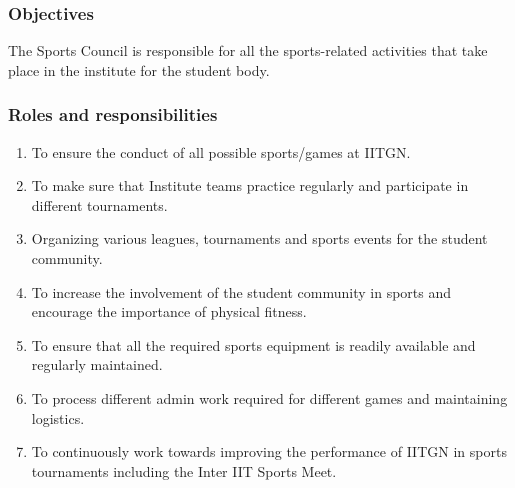 \documentclass[12pt]{article}
\begin{document}
\subsubsection{Objectives}
The Sports Council is responsible for all the sports-related activities that take place in the institute for the student body.

\subsubsection{Roles and responsibilities}
\begin{enumerate}
    \item To ensure the conduct of all possible sports/games at IITGN.
    \item To make sure that Institute teams practice regularly and participate in different tournaments.
    \item Organizing various leagues, tournaments and sports events for the student community.
    \item To increase the involvement of the student community in sports and encourage the importance of physical fitness.
    \item To ensure that all the required sports equipment is readily available and regularly maintained.
    \item To process different admin work required for different games and maintaining logistics.
    \item To continuously work towards improving the performance of IITGN in sports tournaments including the Inter IIT Sports Meet.
\end{enumerate}
\end{document}
